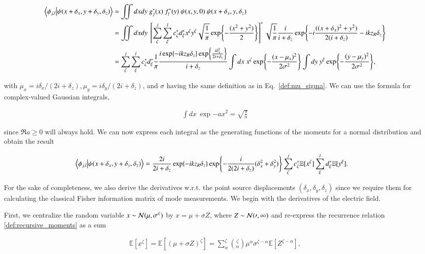 \documentclass[reprint,amsmath,amssymb,aps,pra,floatfix]{revtex4-2}
\begin{document}
\begin{align}
    \braket{\phi_{j,l}}{\psi(x+\delta_x,y+\delta_y,\delta_z)} &= \iint dxdy \  g^*_j(x) \ f^*_l(y) \ \psi(x,y,0) \ \psi(x+\delta_x,y,\delta_z) \nonumber \\
     &= \iint dxdy \ \left [  \sum_\zeta^j \sum_\xi^l c^*_\zeta d^*_\xi x^\zeta y^\xi \sqrt{\frac{1}{\pi}} \exp{-\frac{(x^2 + y^2)}{2}} \right ]^* \sqrt{\frac{1}{\pi}} \frac{i}{i + \delta_z}\exp{-i\frac{((x+\delta_x)^2 + y^2)}{2(i+\delta_z)} - i k z_R \delta_z} \nonumber \\
     &= \sum_\zeta^j  \sum_\xi^l c_\zeta^*  d_\xi^* \frac{1}{\pi} \frac{i \exp{-ikz_R \delta_z} \exp{\frac{i \delta_x^2}{2i+\delta_z}}}{i+\delta_z} \int dx \ x^\zeta \exp{-\frac{(x - \mu_x)^2}{2\sigma^2}} \int dy \ y^\xi \exp{-\frac{(y - \mu_y)^2}{2\sigma^2}},
\end{align}

with $\mu_x = i\delta_x / (2i + \delta_z), \mu_y = i\delta_y / (2i + \delta_z)$, and $\sigma$ having the same definition as in Eq.~\eqref{def:mu_sigma}. We can use the formula for complex-valued Gaussian integrals,

\begin{align}
    \int dx \ \exp{-ax^2} = \sqrt{\frac{\pi}{a}}
\end{align}

since $\Re{a} \geq 0$ will always hold. We can now express each integral as the generating functions of the moments for a normal distribution and obtain the result

\begin{align}
   \braket{\phi_{j,l}}{\psi(x+\delta_x,y+\delta_y,\delta_z)} &= \frac{2i}{2i + \delta_z}  \exp{-ikz_R\delta_z} \exp{-\frac{i}{2(2i +\delta_z)}(\delta_x^2 + \delta_y^2)} \sum_\zeta^j c^*_\zeta \mathbb{E}[x^\zeta]\sum_\xi^l d^*_\xi \mathbb{E}[y^\xi].
\end{align}

For the sake of completeness, we also derive the derivatives w.r.t. the point source displacements $(\delta_x,\delta_y,\delta_z)$ since we require them for calculating the classical Fisher information matrix of mode measurements. We begin with the derivatives of the electric field.

First, we centralize the random variable $x \sim \cal{N} (\mu,\sigma^2)$ by $x=\mu + \sigma Z$, where $Z \sim \cal{N} (0,1)$ and re-express the recurrence relation \eqref{def:recursive_moments} as a sum

\begin{align}
    \mathbb{E}[x^\zeta] = \mathbb{E}[(\mu + \sigma Z)^\zeta] = \sum_\alpha^\zeta \binom{\zeta}{\alpha} \mu^\alpha \sigma^{\zeta-\alpha} \mathbb{E}[Z^{\zeta-\alpha}],
\end{align}
\end{document}
